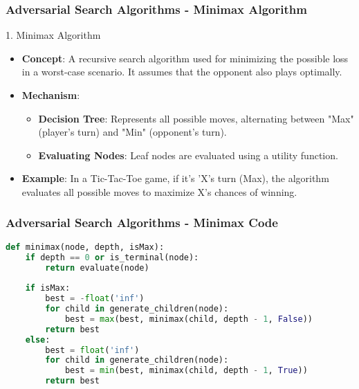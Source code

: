 \documentclass[aspectratio=169]{beamer}
\begin{document}
\begin{frame}[fragile]
    \frametitle{Adversarial Search Algorithms - Minimax Algorithm}
    \begin{block}{1. Minimax Algorithm}
        \begin{itemize}
            \item \textbf{Concept}: A recursive search algorithm used for minimizing the possible loss in a worst-case scenario. It assumes that the opponent also plays optimally.
            \item \textbf{Mechanism}:
              \begin{itemize}
                  \item \textbf{Decision Tree}: Represents all possible moves, alternating between "Max" (player's turn) and "Min" (opponent's turn).
                  \item \textbf{Evaluating Nodes}: Leaf nodes are evaluated using a utility function.
              \end{itemize}
            \item \textbf{Example}: In a Tic-Tac-Toe game, if it's 'X's turn (Max), the algorithm evaluates all possible moves to maximize X's chances of winning.
        \end{itemize}
    \end{block}
\end{frame}

\begin{frame}[fragile]
    \frametitle{Adversarial Search Algorithms - Minimax Code}
    \begin{lstlisting}[language=Python]
def minimax(node, depth, isMax):
    if depth == 0 or is_terminal(node):
        return evaluate(node)
    
    if isMax:
        best = -float('inf')
        for child in generate_children(node):
            best = max(best, minimax(child, depth - 1, False))
        return best
    else:
        best = float('inf')
        for child in generate_children(node):
            best = min(best, minimax(child, depth - 1, True))
        return best
    \end{lstlisting}
\end{frame}
\end{document}
